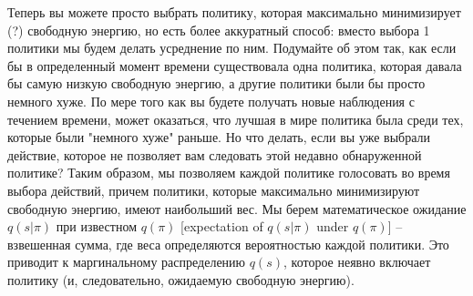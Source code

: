 \documentclass[twoside,leqno, 11pt]{article}
\begin{document}
	\begin{figure}[h]
	\end{figure}
	
	
	Теперь вы можете просто выбрать политику, которая максимально минимизирует (?) свободную энергию, но есть более аккуратный способ: вместо выбора 1 политики мы будем делать усреднение по ним. Подумайте об этом так, как если бы в определенный момент времени существовала одна политика, которая давала бы самую низкую свободную энергию, а другие политики были бы просто немного хуже. По мере того как вы будете получать новые наблюдения с течением времени, может оказаться, что лучшая в мире политика была среди тех, которые были "немного хуже" раньше. Но что делать, если вы уже выбрали действие, которое не позволяет вам следовать этой недавно обнаруженной политике? Таким образом, мы позволяем каждой политике голосовать во время выбора действий, причем политики, которые максимально минимизируют свободную энергию, имеют наибольший вес. Мы берем математическое ожидание $q(s|\pi)$ при известном $q(\pi)$ [expectation of $q(s|\pi)$ under $q(\pi)$] -- взвешенная сумма, где веса определяются вероятностью каждой политики. Это приводит к маргинальному распределению $q(s)$, которое неявно включает политику (и, следовательно, ожидаемую свободную энергию).
	
\end{document}
